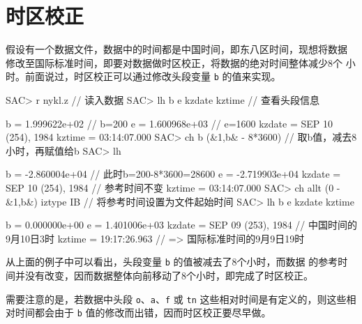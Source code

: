 \section{时区校正}
\label{sec:time-zone-correction}
假设有一个数据文件，数据中的时间都是中国时间，即东八区时间，现想将数据
修改至国际标准时间，即要对数据做时区校正，将数据的绝对时间整体减少8个
小时。前面说过，时区校正可以通过修改头段变量 \texttt{b} 的值来实现。
\begin{SACCode}
SAC> r nykl.z                          // 读入数据
SAC> lh b e kzdate kztime              // 查看头段信息

          b = 1.999622e+02             // b=200
          e = 1.600968e+03             // e=1600
     kzdate = SEP 10 (254), 1984
     kztime = 03:14:07.000
SAC> ch b (&1,b& - 8*3600)             // 取b值，减去8小时，再赋值给b
SAC> lh

          b = -2.860004e+04            // 此时b=200-8*3600=28600
          e = -2.719903e+04
     kzdate = SEP 10 (254), 1984       // 参考时间不变
     kztime = 03:14:07.000
SAC> ch allt (0 - &1,b&) iztype IB     // 将参考时间设置为文件起始时间
SAC> lh b e kzdate kztime

          b = 0.000000e+00
          e = 1.401006e+03
     kzdate = SEP 09 (253), 1984       // 中国时间的9月10日3时
     kztime = 19:17:26.963             // => 国际标准时间的9月9日19时
\end{SACCode}

从上面的例子中可以看出，头段变量 \texttt{b} 的值被减去了8个小时，而数据
的参考时间并没有改变，因而数据整体向前移动了8个小时，即完成了时区校正。

需要注意的是，若数据中头段 \texttt{o}、\texttt{a}、\texttt{f} 或
\texttt{tn} 这些相对时间是有定义的，则这些相对时间都会由于 \texttt{b}
值的修改而出错，因而时区校正要尽早做。
